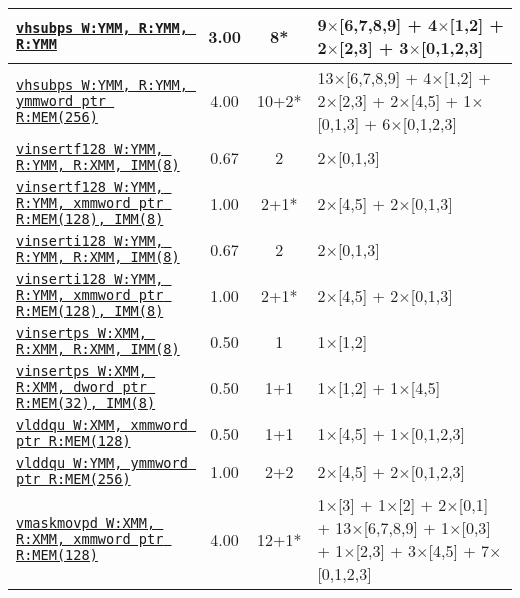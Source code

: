 \documentclass[a4paper,english,fontsize=9]{scrartcl}
\begin{document}
\begin{longtable}{p{}ccL{.25\textwidth}}
  \midrule
  \texttt{\href{https://felixcloutier.com/x86/HSUBPS.html}{vhsubps W:YMM, R:YMM, R:YMM}} & 3.00 & 8* & 9\(\times\)[6,7,8,9] + 4\(\times\)[1,2] + 2\(\times\)[2,3] + 3\(\times\)[0,1,2,3] \\
  \midrule
  \texttt{\href{https://felixcloutier.com/x86/HSUBPS.html}{vhsubps W:YMM, R:YMM, ymmword ptr R:MEM(256)}} & 4.00 & 10+2* & 13\(\times\)[6,7,8,9] + 4\(\times\)[1,2] + 2\(\times\)[2,3] + 2\(\times\)[4,5] + 1\(\times\)[0,1,3] + 6\(\times\)[0,1,2,3] \\
  \midrule
  \texttt{\href{https://felixcloutier.com/x86/VINSERTF128:VINSERTF32x4:VINSERTF64x2:VINSERTF32x8:VINSERTF64x4.html}{vinsertf128 W:YMM, R:YMM, R:XMM, IMM(8)}} & 0.67 & 2 & 2\(\times\)[0,1,3] \\
  \midrule
  \texttt{\href{https://felixcloutier.com/x86/VINSERTF128:VINSERTF32x4:VINSERTF64x2:VINSERTF32x8:VINSERTF64x4.html}{vinsertf128 W:YMM, R:YMM, xmmword ptr R:MEM(128), IMM(8)}} & 1.00 & 2+1* & 2\(\times\)[4,5] + 2\(\times\)[0,1,3] \\
  \midrule
  \texttt{\href{https://felixcloutier.com/x86/VINSERTI128:VINSERTI32x4:VINSERTI64x2:VINSERTI32x8:VINSERTI64x4.html}{vinserti128 W:YMM, R:YMM, R:XMM, IMM(8)}} & 0.67 & 2 & 2\(\times\)[0,1,3] \\
  \midrule
  \texttt{\href{https://felixcloutier.com/x86/VINSERTI128:VINSERTI32x4:VINSERTI64x2:VINSERTI32x8:VINSERTI64x4.html}{vinserti128 W:YMM, R:YMM, xmmword ptr R:MEM(128), IMM(8)}} & 1.00 & 2+1* & 2\(\times\)[4,5] + 2\(\times\)[0,1,3] \\
  \midrule
  \texttt{\href{https://felixcloutier.com/x86/INSERTPS.html}{vinsertps W:XMM, R:XMM, R:XMM, IMM(8)}} & 0.50 & 1 & 1\(\times\)[1,2] \\
  \midrule
  \texttt{\href{https://felixcloutier.com/x86/INSERTPS.html}{vinsertps W:XMM, R:XMM, dword ptr R:MEM(32), IMM(8)}} & 0.50 & 1+1 & 1\(\times\)[1,2] + 1\(\times\)[4,5] \\
  \midrule
  \texttt{\href{https://felixcloutier.com/x86/LDDQU.html}{vlddqu W:XMM, xmmword ptr R:MEM(128)}} & 0.50 & 1+1 & 1\(\times\)[4,5] + 1\(\times\)[0,1,2,3] \\
  \midrule
  \texttt{\href{https://felixcloutier.com/x86/LDDQU.html}{vlddqu W:YMM, ymmword ptr R:MEM(256)}} & 1.00 & 2+2 & 2\(\times\)[4,5] + 2\(\times\)[0,1,2,3] \\
  \midrule
  \texttt{\href{https://felixcloutier.com/x86/VMASKMOV.html}{vmaskmovpd W:XMM, R:XMM, xmmword ptr R:MEM(128)}} & 4.00 & 12+1* & 1\(\times\)[3] + 1\(\times\)[2] + 2\(\times\)[0,1] + 13\(\times\)[6,7,8,9] + 1\(\times\)[0,3] + 1\(\times\)[2,3] + 3\(\times\)[4,5] + 7\(\times\)[0,1,2,3] \\

\end{longtable}
\end{document}
